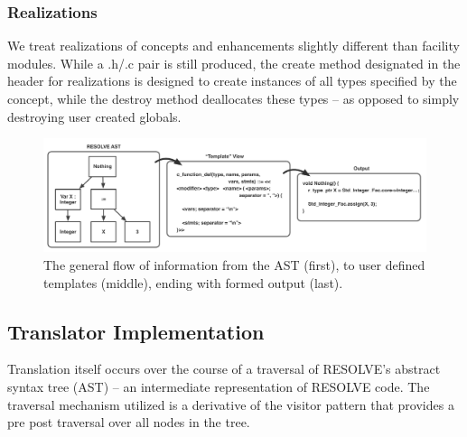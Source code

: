 \subsubsection{Realizations}
\label{sec:facilitiesrealizations}
We treat realizations of concepts and enhancements slightly different than facility modules. While a .h/.c pair is still produced, the create method designated in the header for realizations is designed to create instances of all types specified by the concept, while the destroy method deallocates these types -- as opposed to simply destroying user created globals.



\begin{figure}
\begin{center}
\includegraphics[scale=.55]{figs/ast_traversal2.pdf}
\end{center}
\caption{The general flow of information from the AST (first), to user defined templates (middle), ending with formed output (last).}
\label{fig:ast}
\end{figure}


\subsection{Translator Implementation}

Translation itself occurs over the course of a traversal of RESOLVE's abstract syntax tree (AST) -- an intermediate representation of RESOLVE code. The traversal mechanism utilized is a derivative of the visitor pattern that provides a pre post traversal over all nodes in the tree. 

